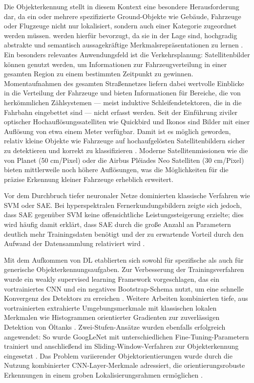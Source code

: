 Die Objekterkennung stellt in diesem Kontext eine besondere Herausforderung dar, da ein oder mehrere spezifizierte Ground-Objekte wie Gebäude, Fahrzeuge oder Flugzeuge nicht nur lokalisiert, sondern auch einer Kategorie zugeordnet werden müssen.  werden hierfür bevorzugt, da sie in der Lage sind, hochgradig abstrakte und semantisch aussagekräftige Merkmalsrepräsentationen zu lernen \cite{Zhu2017}. Ein besonders relevantes Anwendungsfeld ist die Verkehrsplanung: Satellitenbilder können genutzt werden, um Informationen zur Fahrzeugverteilung in einer gesamten Region zu einem bestimmten Zeitpunkt zu gewinnen. Momentaufnahmen des gesamten Straßennetzes liefern dabei wertvolle Einblicke in die Verteilung der Fahrzeuge und bieten Informationen für Bereiche, die von herkömmlichen Zählsystemen — meist induktive Schleifendetektoren, die in die Fahrbahn eingebettet sind — nicht erfasst werden. Seit der Einführung ziviler optischer Hochauflösungssatelliten wie Quickbird und Ikonos sind Bilder mit einer Auflösung von etwa einem Meter verfügbar. Damit ist es möglich geworden, relativ kleine Objekte wie Fahrzeuge auf hochaufgelösten Satellitenbildern sicher zu detektieren und korrekt zu klassifizieren \cite{Eikvil2009}. Moderne Satellitenmissionen wie die von Planet (50 cm/Pixel) \cite{planet_labs} oder die Airbus Pléiades Neo Satelliten (30 cm/Pixel) \cite{airbus_neo} bieten mittlerweile noch höhere Auflösungen, was die Möglichkeiten für die präzise Erkennung kleiner Fahrzeuge erheblich erweitert.

Vor dem Durchbruch tiefer neuronaler Netze dominierten klassische Verfahren wie \Acrfull{SVM} oder \Acrfull{SAE}. Bei hyperspektralen Fernerkundungsbildern zeigte sich jedoch, dass \Acrshort{SAE} gegenüber \Acrshort{SVM} keine offensichtliche Leistungssteigerung erzielte; dies wird häufig damit erklärt, dass \acrshort{SAE} durch die große Anzahl an Parametern deutlich mehr Trainingsdaten benötigt und der zu erwartende Vorteil durch den Aufwand der Datensammlung relativiert wird \cite{Liu2017}.

Mit dem Aufkommen von \Acrlong{DL} etablierten sich  sowohl für spezifische als auch für generische Objekterkennungsaufgaben. Zur Verbesserung der Trainingsverfahren wurde ein weakly supervised learning Framework vorgeschlagen, das ein vortrainiertes \acrshort{CNN} und ein negatives Bootstrap-Schema nutzt, um eine schnelle Konvergenz des Detektors zu erreichen \cite{Zhou2016}. Weitere Arbeiten kombinierten tiefe, aus vortrainierten  extrahierte Umgebungsmerkmale mit klassischen lokalen Merkmalen wie Histogrammen orientierter Gradienten \cite{Dalal2005} zur zuverlässigen Detektion von Öltanks \cite{Zhang2015}. Zwei-Stufen-Ansätze wurden ebenfalls erfolgreich angewendet: So wurde GoogLeNet mit unterschiedlichen Fine-Tuning-Parametern trainiert und anschließend im Sliding-Window-Verfahren zur Objekterkennung eingesetzt \cite{Sevo2016}. Das Problem variierender Objektorientierungen wurde durch die Nutzung kombinierter \acrshort{CNN}-Layer-Merkmale adressiert, die orientierungsrobuste Erkennungen in einem groben Lokalisierungsrahmen ermöglichen \cite{Zhu2015}.

